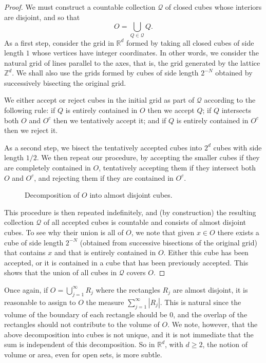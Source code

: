 \documentclass[11pt,openany]{book}
\begin{document}
\begin{proof}
We must construct a countable collection $\mathcal Q$ of closed cubes whose interiors are disjoint, and so that
\[
 O=\bigcup_{Q\in\mathcal Q}Q.
\]
As a first step, consider the grid in $\mathbb{R}^d$ formed by taking all closed cubes of side length $1$ whose vertices have integer coordinates. In other words, we consider the natural grid of lines parallel to the axes, that is, the grid generated by the lattice $\mathbb{Z}^d$. We shall also use the grids formed by cubes of side length $2^{-N}$ obtained by successively bisecting the original grid.

We either accept or reject cubes in the initial grid as part of $\mathcal Q$ according to the following rule: if $Q$ is entirely contained in $O$ then we accept $Q$; if $Q$ intersects both $O$ and $O^c$ then we tentatively accept it; and if $Q$ is entirely contained in $O^c$ then we reject it.

As a second step, we bisect the tentatively accepted cubes into $2^d$ cubes with side length $1/2$. We then repeat our procedure, by accepting the smaller cubes if they are completely contained in $O$, tentatively accepting them if they intersect both $O$ and $O^c$, and rejecting them if they are contained in $O^c$.

\begin{figure}[ht]
\centering
{}
\caption{Decomposition of $O$ into almost disjoint cubes.}
\end{figure}

This procedure is then repeated indefinitely, and (by construction) the resulting collection $\mathcal Q$ of all accepted cubes is countable and consists of almost disjoint cubes. To see why their union is all of $O$, we note that given $x\in O$ there exists a cube of side length $2^{-N}$ (obtained from successive bisections of the original grid) that contains $x$ and that is entirely contained in $O$. Either this cube has been accepted, or it is contained in a cube that has been previously accepted. This shows that the union of all cubes in $\mathcal Q$ covers $O$.
\end{proof}

Once again, if $O=\bigcup_{j=1}^{\infty}R_j$ where the rectangles $R_j$ are almost disjoint, it is reasonable to assign to $O$ the measure $\sum_{j=1}^{\infty}|R_j|$. This is natural since the volume of the boundary of each rectangle should be $0$, and the overlap of the rectangles should not contribute to the volume of $O$. We note, however, that the above decomposition into cubes is not unique, and it is not immediate that the sum is independent of this decomposition. So in $\mathbb{R}^d$, with $d\ge2$, the notion of volume or area, even for open sets, is more subtle.
\end{document}
